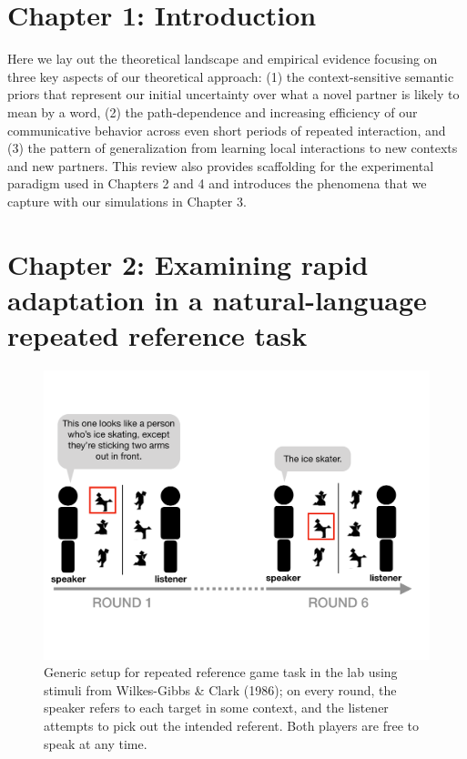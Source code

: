 \documentclass[12pt, donotrepeattitle, man, floatsintext]{apa6}
\begin{document}
\section{Chapter 1: Introduction}

Here we lay out the theoretical landscape and empirical evidence focusing on three key aspects of our theoretical approach: (1) the context-sensitive semantic priors that represent our initial uncertainty over what a novel partner is likely to mean by a word, (2) the path-dependence and increasing efficiency of our communicative behavior across even short periods of repeated interaction, and (3) the pattern of generalization from learning local interactions to new contexts and new partners. This review also provides scaffolding for the experimental paradigm used in Chapters 2 and 4 and introduces the phenomena that we capture with our simulations in Chapter 3.

    \vspace{1cm}

\noindent{}
\section{Chapter 2: Examining rapid adaptation in a natural-language repeated reference task }

\begin{figure}[t]
\centering
\includegraphics[scale=.45]{task_cropped.pdf}
\caption{Generic setup for repeated reference game task in the lab using stimuli from Wilkes-Gibbs \& Clark (1986); on every round, the speaker refers to each target in some context, and the listener attempts to pick out the intended referent. Both players are free to speak at any time.}
\label{fig:tangramsmethods}
\end{figure}
\end{document}
